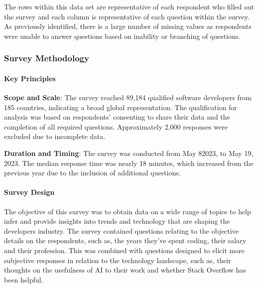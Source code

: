 \documentclass[
  12pt,
]{article}
\begin{document}
The rows within this data set are representative of each respondent who
filled out the survey and each column is representative of each question
within the survey. As previously identified, there is a large number of
missing values as respondents were unable to answer questions based on
inability or branching of questions.

\hypertarget{survey-methodology}{%
\subsubsection{Survey Methodology}\label{survey-methodology}}

\newline
\newline

\hypertarget{key-principles}{%
\paragraph{Key Principles}\label{key-principles}}

\newline
\newline

\textbf{Scope and Scale}: The survey reached 89,184 qualified software
developers from 185 countries, indicating a broad global representation.
The qualification for analysis was based on respondents' consenting to
share their data and the completion of all required questions.
Approximately 2,000 responses were excluded due to incomplete data.
\newline \newline

\textbf{Duration and Timing}: The survey was conducted from May 82023,
to May 19, 2023. The median response time was nearly 18 minutes, which
increased from the previous year due to the inclusion of additional
questions. \newline \newline \newline

\hypertarget{survey-design}{%
\paragraph{Survey Design}\label{survey-design}}

The objective of this survey was to obtain data on a wide range of
topics to help infer and provide insights into trends and technology
that are shaping the developers industry. The survey contained questions
relating to the objective details on the respondents, such as, the years
they've spent coding, their salary and their profession. This was
combined with questions designed to elicit more subjective responses in
relation to the technology landscape, such as, their thoughts on the
usefulness of AI to their work and whether Stack Overflow has been
helpful. \newline
\end{document}
